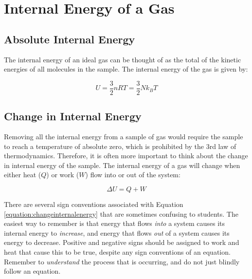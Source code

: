 		
	\section{Internal Energy of a Gas}
			\subsection{Absolute Internal Energy}
				The internal energy of an ideal gas can be thought of as the total of the kinetic energies of all molecules in the sample.  The internal energy of the gas is given by:
				
	\begin{mdframed}[backgroundcolor=orange!20!white]
		\begin{equation}
			U = \frac{3}{2}nRT = \frac{3}{2} N k_BT
			\label{equation:internalenergy}
		\end{equation}
	\end{mdframed}

	\subsection{Change in Internal Energy} 
	
	Removing all the internal energy from a sample of gas would require the sample to reach a temperature of absolute zero, which is prohibited by the 3rd law of thermodynamics.  Therefore, it is often more important to think about the change in internal energy of the sample.  The internal energy of a gas will change when either heat ($Q$) or work ($W$) flow into or out of the system: 
	
		\begin{mdframed}[backgroundcolor=orange!20!white]
		\begin{equation}
			\Delta U = Q + W
			\label{equation:changeinternalenergy}
		\end{equation}
	\end{mdframed}
	
	There are several sign conventions associated with Equation \ref{equation:changeinternalenergy} that are sometimes confusing to students.  The easiest way to remember is that energy that flows \textit{into} a system causes its internal energy to \textit{increase}, and energy that flows \textit{out} of a system causes its energy to decrease.  Positive and negative signs should be assigned to work and heat that cause this to be true, despite any sign conventions of an equation.  Remember to \textit{understand} the process that is occurring, and do not just blindly follow an equation. 
	

